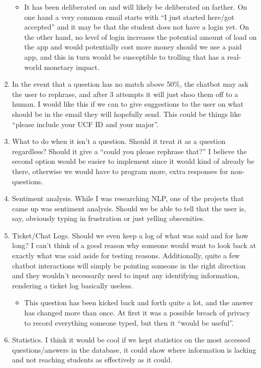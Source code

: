 \documentclass[titlepage, 12pt]{article}
\begin{document}
\begin{enumerate}
    \begin{itemize}
        \item It has been deliberated on and will likely be deliberated on farther. On one hand a very common email starts with “I just started here/got accepted” and it may be that the student does not have a login yet. On the other hand, no level of login increases the potential amount of load on the app and would potentially cost more money should we use a paid app, and this in turn would be susceptible to trolling that has a real-world monetary impact.
    \end{itemize}
    \item In the event that a question has no match above 50\%, the chatbot may ask the user to rephrase, and after 3 attempts it will just shoo them off to a human. I would like this if we can to give suggestions to the user on what should be in the email they will hopefully send. This could be things like “please include your UCF ID and your major”.
    \item What to do when it isn’t a question. Should it treat it as a question regardless? Should it give a “could you please rephrase that?” I believe the second option would be easier to implement since it would kind of already be there, otherwise we would have to program more, extra responses for non-questions. 
    \item Sentiment analysis. While I was researching NLP, one of the projects that came up was sentiment analysis. Should we be able to tell that the user is, say, obviously typing in frustration or just yelling obscenities.
    \item Ticket/Chat Logs. Should we even keep a log of what was said and for how long? I can’t think of a good reason why someone would want to look back at exactly what was said aside for testing reasons. Additionally, quite a few chatbot interactions will simply be pointing someone in the right direction and they wouldn’t necessarily need to input any identifying information, rendering a ticket log basically useless. 
    \begin{itemize}
        \item This question has been kicked back and forth quite a lot, and the answer has changed more than once. At first it was a possible breach of privacy to record everything someone typed, but then it “would be useful”.
    \end{itemize}
    \item Statistics. I think it would be cool if we kept statistics on the most accessed questions/answers in the database, it could show where information is lacking and not reaching students as effectively as it could.

\end{enumerate}
\end{document}
